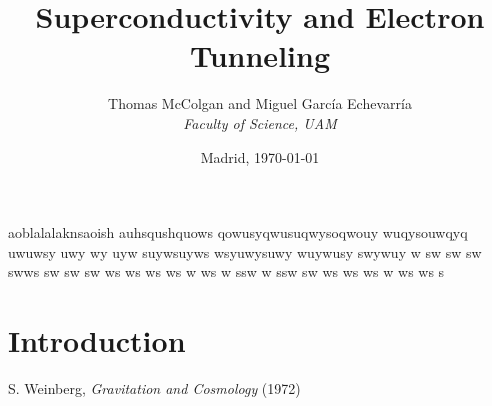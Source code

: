 \documentclass[twocolumn,a4papper,10pt]{article}
\title{\textbf{Superconductivity and Electron Tunneling}}
\author{Thomas McColgan and Miguel Garc\'ia Echevarr\'ia\\
	\textit{Faculty of Science, UAM}}
\date{Madrid, \today}
\begin{document}
\maketitle
aoblalalaknsaoish auhsqushquows qowusyqwusuqwysoqwouy wuqysouwqyq uwuwsy uwy wy uyw suywsuyws wsyuwysuwy wuywusy swywuy w sw sw sw swws  sw sw sw ws ws  ws ws w ws w ssw w ssw sw ws ws ws w ws ws s 
\section{Introduction}
\begin{thebibliography}{99}
 S. Weinberg, \emph{Gravitation and Cosmology} (1972)
\end{thebibliography}
\end{document}
